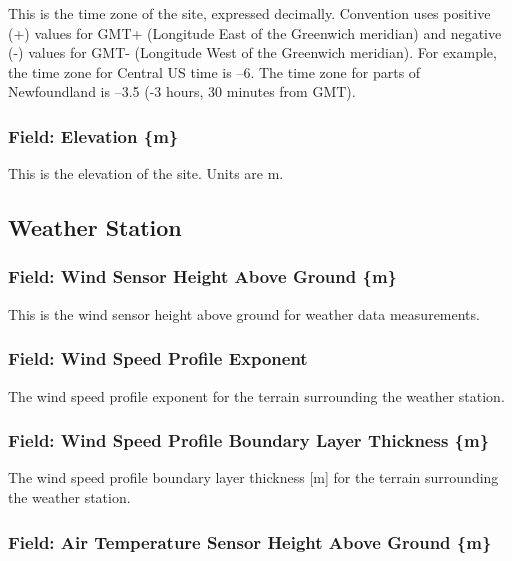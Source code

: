 This is the time zone of the site, expressed decimally. Convention uses positive (+) values for GMT+ (Longitude East of the Greenwich meridian) and negative (-) values for GMT- (Longitude West of the Greenwich meridian). For example, the time zone for Central US time is --6. The time zone for parts of Newfoundland is --3.5 (-3 hours, 30 minutes from GMT).

\subsubsection{Field: Elevation \{m\}}\label{field-elevation-m}

This is the elevation of the site. Units are m.

\subsection{Weather Station}\label{weather-station}

\subsubsection{Field: Wind Sensor Height Above Ground \{m\}}\label{field-wind-sensor-height-above-ground-m}

This is the wind sensor height above ground for weather data measurements.

\subsubsection{Field: Wind Speed Profile Exponent}\label{field-wind-speed-profile-exponent}

The wind speed profile exponent for the terrain surrounding the weather station.

\subsubsection{Field: Wind Speed Profile Boundary Layer Thickness \{m\}}\label{field-wind-speed-profile-boundary-layer-thickness-m}

The wind speed profile boundary layer thickness {[}m{]} for the terrain surrounding the weather station.

\subsubsection{Field: Air Temperature Sensor Height Above Ground \{m\}}\label{field-air-temperature-sensor-height-above-ground-m}

